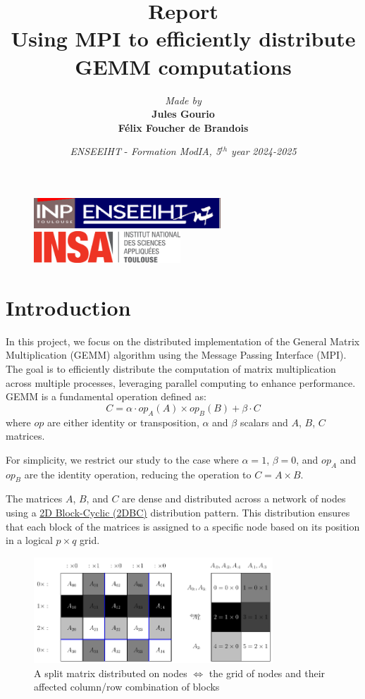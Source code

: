 \documentclass[12pt,a4paper]{article}
\title{\vspace{4cm}
        Report \\
        \vspace{1cm} \textbf{Using MPI to eﬀiciently distribute GEMM computations} \\ 
        \vspace{4cm} 
}
\author{\textit{Made by} \vspace{0.5cm}\\
         \textbf{Jules Gourio} \\
        \textbf{Félix Foucher de Brandois}
}
\date{\vfill
        \textit{ENSEEIHT} - 
        \textit{Formation ModIA, 5$^{th}$ year}
        \hfill
        \textit{2024-2025} \\
        \vspace{1cm}
}
\begin{document}
\begin{figure}[t]
    \centering
    \includegraphics[width=7cm]{src/inp_n7.png}
    \hfill
    \includegraphics[width=5.5cm]{src/insa_toulouse.png}
\end{figure}


\maketitle
\thispagestyle{empty}

\newpage


\section{Introduction}

In this project, we focus on the distributed implementation of the General Matrix Multiplication (GEMM) algorithm using the Message Passing Interface (MPI).
The goal is to efficiently distribute the computation of matrix multiplication across multiple processes, leveraging parallel computing to enhance performance.
GEMM is a fundamental operation defined as:
\begin{equation}
    C = \alpha \cdot op_A(A) \times op_B(B) + \beta \cdot C
\end{equation}
where \(op\) are either identity or transposition, \(\alpha\) and \(\beta\) scalars and \(A\), \(B\), \( C \) matrices.

For simplicity, we restrict our study to the case where \(\alpha = 1\), \(\beta = 0\), and \(op_A\) and \(op_B\) are the identity operation, reducing the operation to \(C = A \times B\).

The matrices \(A\), \(B\), and \(C\) are dense and distributed across a network of nodes using a \href{https://www.netlib.org/scalapack/slug/node75.html}{2D Block-Cyclic (2DBC)} distribution pattern.
This distribution ensures that each block of the matrices is assigned to a specific node based on its position in a logical \(p \times q\) grid. \\

\begin{figure}[H]
        \centering
        \includegraphics[width=0.8\textwidth]{src/2dbc.png}
        \caption{A split matrix distributed on nodes $\Leftrightarrow$ the grid of nodes and their affected column/row combination of blocks}
        \label{fig:2dbc}
\end{figure}
\end{document}
